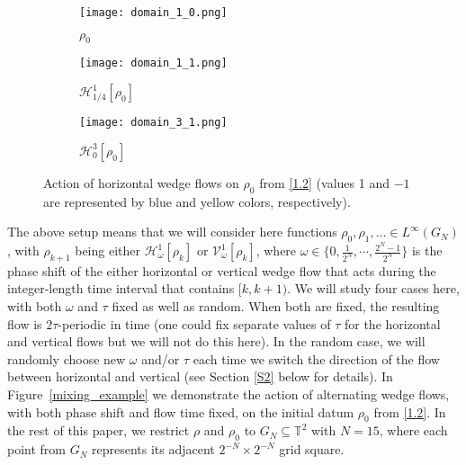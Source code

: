 \documentclass[12pt]{article}
\numberwithin{figure}{section}
\numberwithin{equation}{section}
\newcommand{\bbT}{{\mathbb{T}}}
\newcommand{\calH}{{\mathcal{H}}}
\newcommand{\calV}{{\mathcal{V}}}
\begin{document}
\begin{figure}[ht]
    \centering
    \begin{subfigure}[t]{0.3\textwidth}
        \centering
        \texttt{[image: domain\_1\_0.png]}
        \caption{$\rho_0$}
    \end{subfigure}
        \hfill
    \begin{subfigure}[t]{0.3\textwidth}
        \centering
        \texttt{[image: domain\_1\_1.png]}
        \caption{$\calH_{1/4}^{1}[\rho_0]$}
    \end{subfigure}
    \hfill
    \begin{subfigure}[t]{0.3\textwidth}
        \centering
        \texttt{[image: domain\_3\_1.png]}
        \caption{$\calH_{0}^{3}[\rho_0]$}
    \end{subfigure}

    
    \caption{Action of horizontal wedge flows on $\rho_0$ from \eqref{1.2} (values 1 and $-1$ are represented by blue and yellow colors, respectively).}
    \label{flow_examples}
\end{figure}



The above setup means that we will consider here functions $\rho_0,\rho_1,\dots\in L^\infty(G_N)$, with $\rho_{k+1}$  being either $\calH_\omega^1[\rho_k]$ or $\calV_\omega^1[\rho_k]$, where $\omega\in\{0,\frac 1{2^{N}},\cdots,\frac{2^N-1}{2^{N}}\}$ is the phase shift of the either horizontal or vertical wedge flow that acts during the integer-length time interval that contains $[k,k+1)$.
We will study four cases here, with both $\omega$ and $\tau$ fixed as well as random.  When both are fixed, the resulting  flow is $2\tau$-periodic in time (one could fix separate values of $\tau$ for the horizontal and vertical flows but we will not do this here).  In the random case, we will randomly choose new $\omega$ and/or $\tau$ each time we switch the direction of the flow between horizontal and vertical (see Section \ref{S2} below for details).  In Figure~\ref{mixing_example}  we demonstrate the action of alternating wedge flows, with both phase shift and flow time fixed,  on the initial datum $\rho_0$ from \eqref{1.2}. 
In  the rest of this paper, we restrict $\rho$ and $\rho_0$ to $G_N\subseteq \bbT^2$ with $N=15$, where each point from $G_N$ represents its adjacent $2^{-N}\times 2^{-N}$ grid square.
\end{document}
